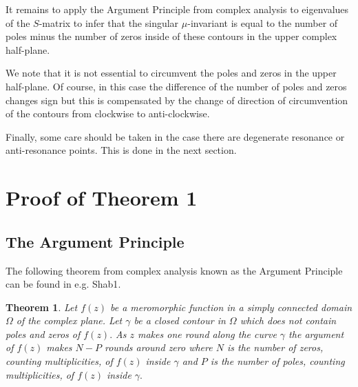 \documentclass[11pt]{amsart}
\newtheorem{thm}{Theorem}                     [section]
\numberwithin{equation}{section}
\begin{document}
It remains to apply the Argument Principle from complex analysis to eigenvalues of the $S$-matrix to infer that
the singular $\mu$-invariant is equal to the number of poles minus the number of zeros inside of these contours in the upper complex half-plane.

We note that it is not essential to circumvent the poles and zeros in the upper half-plane. Of course, in this case the difference of the number
of poles and zeros changes sign but this is compensated by the change of direction of circumvention of the contours from clockwise to anti-clockwise.

Finally, some care should be taken in the case there are degenerate resonance or anti-resonance points. This is done in the next section.

\section{Proof of Theorem 1}
\subsection{The Argument Principle}
The following theorem from complex analysis known as the Argument Principle can be found in e.g. {\futurelet\NChar\CleverCite}{Shab1}.
\begin{thm} \label{T: Argument Principle} Let $f(z)$ be a meromorphic function in a simply connected domain $\Omega$ of the complex plane.
Let $\gamma$ be a closed contour in $\Omega$ which does not contain poles and zeros of $f(z).$ As $z$ makes one round along the curve $\gamma$
the argument of $f(z)$ makes $N-P$ rounds around zero where $N$ is the number of zeros, counting multiplicities, of $f(z)$ inside $\gamma$ and $P$ is the number
of poles, counting multiplicities, of $f(z)$ inside $\gamma.$
\end{thm}
\end{document}
